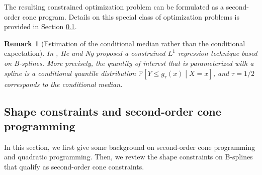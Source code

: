 \documentclass[a4paper]{article}
\newtheorem*{remark}{Remark}
\newcommand{\1}{\textbf{1}}
\newcommand{\PP}{\mathbb{P}}
\begin{document}
\par The resulting constrained optimization problem can be formulated as a second-order cone program. Details on this special class of optimization problems is provided in Section \ref{sec:shape_constraints}.
\begin{remark}[Estimation of the conditional median rather than the conditional expectation]
\par In \cite{HeNgConstrainedSplines}, He and Ng proposed a constrained $L^1$ regression technique based on B-splines. More precisely, the quantity of interest that is parameterized with a spline is a conditional quantile distribution $\PP\left[Y \leq g_\tau(x)\middle| X = x \right]$, and $\tau = 1/2$ corresponds to the conditional median. 
\end{remark}
\subsection{Shape constraints and second-order cone programming}\label{sec:shape_constraints}
\par In this section, we first give some background on second-order cone programming and quadratic programming. Then, we review the shape constraints on B-splines that qualify as second-order cone constraints. 
\end{document}
